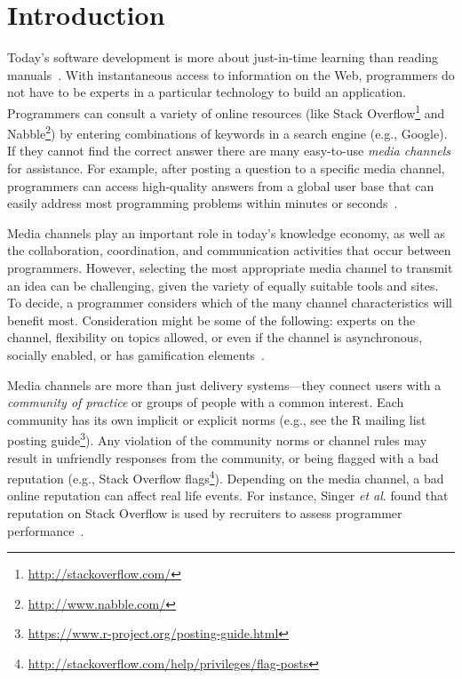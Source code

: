 \documentclass{sig-alternate-05-2015}
\begin{document}


\section{Introduction}
\label{cha:introduction}

	Today's software development is more about just-in-time learning than reading manuals~\cite{Hartmann2008}.
	With instantaneous access to information on the Web, programmers do not have to be experts in a particular technology to build an application.
	Programmers can consult a variety of online resources (like Stack Overflow\footnote{\url{http://stackoverflow.com/}} and Nabble\footnote{\url{http://www.nabble.com/}}) by entering combinations of keywords in a search engine (e.g., Google).
	If they cannot find the correct answer there are many easy-to-use \textit{media channels} for assistance. For example, after posting a question to a specific media channel, programmers can access high-quality answers from a global user base that can easily address most programming problems within minutes or seconds~\cite{Mamykina2011}.

	Media channels play an important role in today's knowledge economy, as well as the collaboration, coordination, and communication activities that occur between programmers. However, selecting the most appropriate media channel to transmit an idea can be challenging, given the variety of equally suitable tools and sites.
	To decide, a programmer considers which of the many channel characteristics will benefit most. Consideration might be some of the following: experts on the channel, flexibility on topics allowed, or even if the channel is asynchronous, socially enabled, or has gamification elements~\cite{Vasilescu2014c}.

	Media channels are more than just delivery systems---they connect users with a \textit{community of practice} or groups of people with a common interest.
	Each community has its own implicit or explicit norms (e.g., see the R mailing list posting guide\footnote{\url{https://www.r-project.org/posting-guide.html}}).
	Any violation of the community norms or channel rules may result in unfriendly responses from the community, or being flagged with a bad reputation (e.g., Stack Overflow flags\footnote{\url{http://stackoverflow.com/help/privileges/flag-posts}}).
	Depending on the media channel, a bad online reputation can affect real life events.
	For instance, Singer \textit{et al}. found that reputation on Stack Overflow is used by recruiters to assess programmer performance~\cite{Singer2013}.
\end{document}
